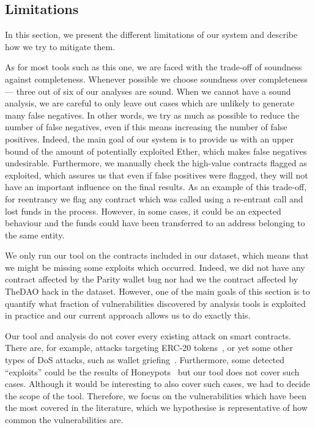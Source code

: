 \subsection{Limitations}
\label{sec:limitations} 
In this section, we present the different limitations of our system and describe how we try to mitigate them.

 As for most tools such as this one, we are faced with the trade-off of soundness against completeness. Whenever possible we choose soundness over completeness --- three out of six of our analyses are sound. When we cannot have a sound analysis, we are careful to only leave out cases which are unlikely to generate many false negatives. In other words, we try as much as possible to reduce the number of false negatives, even if this means increasing the number of false positives.
Indeed, the main goal of our system is to provide us with an upper bound of the amount of potentially exploited Ether, which makes false negatives undesirable.
Furthermore, we manually check the high-value contracts flagged as exploited, which assures us that even if false positives were flagged, they will not have an important influence on the final results.
As an example of this trade-off, for reentrancy we flag any contract which was called using a re-entrant call and lost funds in the process. However, in some cases, it could be an expected behaviour and the funds could have been transferred to an address belonging to the same entity.

 We only run our tool on the contracts included in our dataset, which means that we might be missing some exploits which occurred. Indeed, we did not have any contract affected by the Parity wallet bug nor had we the contract affected by TheDAO hack in the dataset.
However, one of the main goals of this section is to quantify what fraction of vulnerabilities discovered by analysis tools is exploited in practice and our current approach allows us to do exactly this.

 Our tool and analysis do not cover every existing attack on smart contracts. There are, for example, attacks targeting ERC-20 tokens~\cite{8802438}, or yet some other types of DoS attacks, such as wallet griefing~\cite{Grech2018}.
Furthermore, some detected ``exploits'' could be the results of Honeypots~\cite{236240} but our tool does not cover such cases.
Although it would be interesting to also cover such cases, we had to decide the scope of the tool. Therefore, we focus on the vulnerabilities which have been the most covered in the literature, which we hypothesise is representative of how common the vulnerabilities are.
